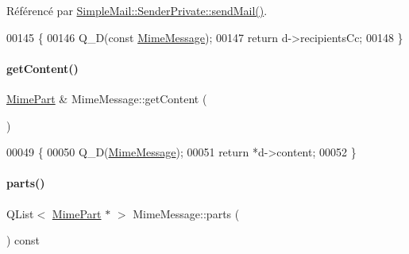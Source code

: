 Référencé par \hyperlink{class_simple_mail_1_1_sender_private_a2ede5284746e77ee37b8fe96f4bbb100}{Simple\+Mail\+::\+Sender\+Private\+::send\+Mail()}.


\begin{DoxyCode}
00145 \{
00146     Q\_D(\textcolor{keyword}{const} \hyperlink{class_simple_mail_1_1_mime_message}{MimeMessage});
00147     \textcolor{keywordflow}{return} d->recipientsCc;
00148 \}
\end{DoxyCode}
\mbox{\label{class_simple_mail_1_1_mime_message_ab5708266287367c6741e6f2e479a90fb}} 
\paragraph{\texorpdfstring{get\+Content()}{getContent()}}
{\footnotesize\ttfamily \hyperlink{class_simple_mail_1_1_mime_part}{Mime\+Part} \& Mime\+Message\+::get\+Content (\begin{DoxyParamCaption}{ }\end{DoxyParamCaption})}


\begin{DoxyCode}
00049 \{
00050     Q\_D(\hyperlink{class_simple_mail_1_1_mime_message}{MimeMessage});
00051     \textcolor{keywordflow}{return} *d->content;
00052 \}
\end{DoxyCode}
\mbox{\label{class_simple_mail_1_1_mime_message_a3159d513eb978ea8b764d5defcde12dd}} 
\paragraph{\texorpdfstring{parts()}{parts()}}
{\footnotesize\ttfamily Q\+List$<$ \hyperlink{class_simple_mail_1_1_mime_part}{Mime\+Part} $\ast$ $>$ Mime\+Message\+::parts (\begin{DoxyParamCaption}{ }\end{DoxyParamCaption}) const}


